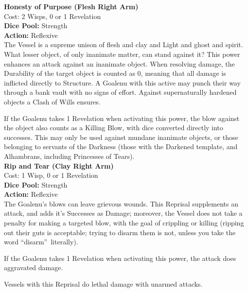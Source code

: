 \noindent\textbf{Honesty of Purpose (Flesh Right Arm)}\\

\noindent Cost: 2 Wisps, 0 or 1 Revelation\\

\noindent\textbf{Dice Pool:} Strength\\

\noindent\textbf{Action:} Reflexive\\

\noindent The Vessel is a supreme unison of flesh and clay and Light and ghost and spirit. What lesser object, of only inanimate matter, can stand against it? This power enhances an attack against an inanimate object. When resolving damage, the Durability of the target object is counted as 0, meaning that all damage is inflicted directly to Structure. A Goalenu with this active may punch their way through a bank vault with no signs of effort. Against supernaturally hardened objects a Clash of Wills ensures. 

If the Goalenu takes 1 Revelation when activating this power, the blow against the object also counts as a Killing Blow, with dice converted directly into successes. This may only be used against mundane inanimate objects, or those belonging to servants of the Darkness (those with the Darkened template, and Alhambrans, including Princesses of Tears).\\

\noindent\textbf{Rip and Tear (Clay Right Arm)}\\

\noindent Cost: 1 Wisp, 0 or 1 Revelation\\

\noindent\textbf{Dice Pool:} Strength\\

\noindent\textbf{Action:} Reflexive\\

\noindent The Goalenu's blows can leave grievous wounds. This Reprisal supplements an attack, and adds it's Successes as Damage; moreover, the Vessel does not take a penalty for making a targeted blow, with the goal of crippling or killing (ripping out their guts is acceptable; trying to disarm them is not, unless you take the word \textquotedblleft disarm\textquotedblright\, literally).

If the Goalenu takes 1 Revelation when activating this power, the attack does aggravated damage.

Vessels with this Reprisal do lethal damage with unarmed attacks.\\


